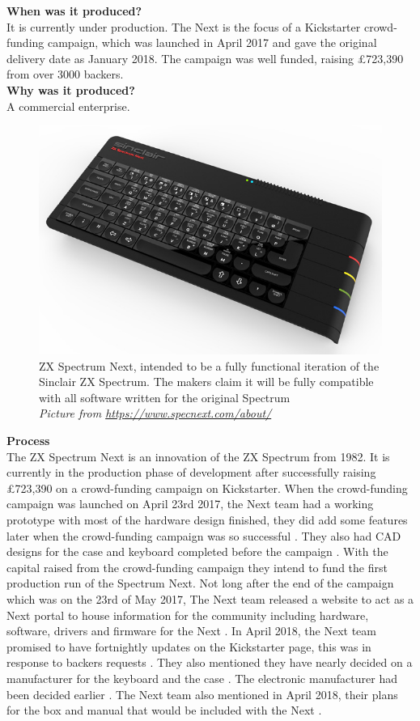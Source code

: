 \textbf{When was it produced?}\\
It is currently under production. The Next is the focus of a Kickstarter crowd-funding campaign, which was launched in April 2017 and gave the original delivery date as January 2018. The campaign was well funded, raising £723,390 from over 3000 backers. \\

\textbf{Why was it produced?}\\
A commercial enterprise. \\

\begin{figure} \begin{center}
\includegraphics[width=.3\linewidth]{pics/spectrum_next} 
\end{center} 
\caption{ZX Spectrum Next, intended to be a fully functional iteration of the Sinclair ZX Spectrum. The makers claim it will be fully compatible with all software written for the original Spectrum \\ \textit{\small{Picture from \url {https://www.specnext.com/about/}}}}
\label{Spectrum_Next}
\end{figure} 

\textbf{Process}\\
The ZX Spectrum Next is an innovation of the ZX Spectrum from 1982. It is currently in the production phase of development after successfully raising \pounds 723,390 on a crowd-funding campaign on Kickstarter. When the crowd-funding campaign was launched on April 23rd 2017, the Next team had a working prototype with most of the hardware design finished, they did add some features later when the crowd-funding campaign was so successful 
\cite{RN151}. They also had CAD designs for the case and keyboard completed before the campaign 
\cite{RN149}. With the capital raised from the crowd-funding campaign they intend to fund the first production run of the Spectrum Next. Not long after the end of the campaign which was on the 23rd of May 2017, The Next team released a website to act as a Next portal to house information for the community including hardware, software, drivers and firmware for the Next 
\cite{RN154}. In April 2018, the Next team promised to have fortnightly updates on the Kickstarter page, this was in response to backers requests 
\cite{RN155}. They also mentioned they have nearly decided on a manufacturer for the keyboard and the case 
\cite{RN155}. The electronic manufacturer had been decided earlier 
\cite{RN151}. The Next team also mentioned in April 2018, their plans for the box and manual that would be included with the Next 
\cite{RN151}.\\

